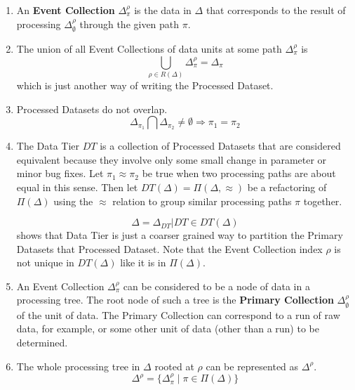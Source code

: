 \documentclass[pdftex]{cmspaper}
\begin{document}
{\begin{enumerate}
\item An {\bf Event Collection} $\Delta_{\pi}^{\rho}$ is the data in 
      $\Delta$ that corresponds to the result of processing 
      $\Delta_{\emptyset}^{\rho}$ through the given path $\pi$.  

\item The union of all Event Collections of data units at some path 
      $\Delta_{\pi}^{\rho}$ is 
\begin{equation}
\bigcup_{\rho \in R(\Delta)} \Delta_{\pi}^{\rho} = \Delta_{\pi}
\end{equation}
which is just another way of writing the Processed Dataset.  

\item Processed Datasets do not overlap.  
\begin{equation}
\Delta_{\pi_1} \bigcap \Delta_{\pi_2} \not= \emptyset \Rightarrow \pi_1 = \pi_2
\end{equation}

\item The Data Tier $DT$ is a collection of Processed Datasets that are 
      considered equivalent because they involve only some small change 
      in parameter or minor bug fixes.  Let $\pi_1 \approx \pi_2$ be 
      true when two processing paths are about equal in this sense. 
      Then let $DT(\Delta) = \Pi(\Delta,\approx)$ be a refactoring of 
      $\Pi(\Delta)$ using the $\approx$ relation to group similar 
      processing paths $\pi$ together.  

\begin{equation}
\Delta = {\Delta_{DT} | DT \in DT(\Delta)}
\end{equation}
shows that Data Tier is just a coarser grained way to partition the 
Primary Datasets that Processed Dataset.  Note that the Event Collection 
index $\rho$ is not unique in $DT(\Delta)$ like it is in $\Pi(\Delta)$.

\item An Event Collection $\Delta_{\pi}^{\rho}$ can be considered to be 
      a node of data in a processing tree. The root node of such a tree is 
      the {\bf Primary Collection} $\Delta_{\emptyset}^{\rho}$ of the 
      unit of data.  The Primary Collection can correspond to a run of 
      raw data, for example, or some other unit of data (other than a run) 
      to be determined.  

\item The whole processing tree in $\Delta$ rooted at $\rho$ can be 
      represented as $\Delta^{\rho}$. 
\begin{equation}
\Delta^{\rho} = \{ \Delta_{\pi}^{\rho} \mid \pi \in \Pi(\Delta) \}
\end{equation}


\end{enumerate}}
\end{document}
